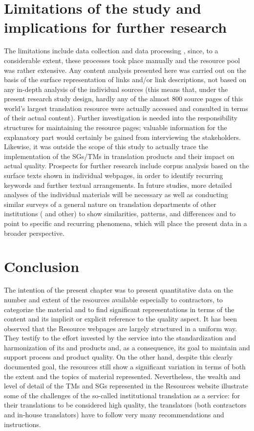 \documentclass[output=paper]{langsci/langscibook}
\begin{document}
\section{Limitations of the study and implications for further research}\label{sec:svoboda:6}

The limitations include data collection and data processing , since, to a considerable extent, these processes took place manually and the resource pool was rather extensive. Any content analysis presented here was carried out on the basis of the surface representation of links and/or link descriptions, not based on any in-depth analysis of the individual sources (this means that, under the present research study design, hardly any of the almost 800 source pages of this world’s largest translation resource were actually accessed and consulted in terms of their actual content). Further investigation is needed into the responsibility structures for maintaining the resource pages; valuable information for the explanatory part would certainly be gained from interviewing the stakeholders. Likewise, it was outside the scope of this study to actually trace the implementation of the SGs/TMs in translation products and their impact on actual  quality. Prospects for further research include corpus analysis based on the surface texts shown in individual webpages, in order to identify recurring keywords and further textual arrangements. In future studies, more detailed analyses of the individual materials will be necessary as well as conducting similar surveys of a general nature on translation departments of other institutions ( and other) to show similarities, patterns, and differences and to point to specific and recurring phenomena, which will place the present data in a broader perspective.

\section{Conclusion}\label{sec:svoboda:7}
\largerpage
The intention of the present chapter was to present quantitative data on the number and extent of the resources available especially to  contractors, to categorize the material and to find significant representations in terms of the content and its implicit or explicit reference to the quality aspect. It has been observed that the Resource webpages are largely structured in a uniform way. They testify to the effort invested by the  service into the standardization and harmonization of its  and products and, as a consequence, its goal to maintain and support process and product quality. On the other hand, despite this clearly documented goal, the  resources still show a significant variation in terms of both the extent and the topics of material represented. Nevertheless, the wealth and level of detail of the TMs and SGs represented in the  Resources website illustrate some of the challenges of the so-called institutional  translation as a service: for their translations to be considered high quality, the translators (both contractors and in-house translators) have to follow very many recommendations and instructions.
\end{document}
